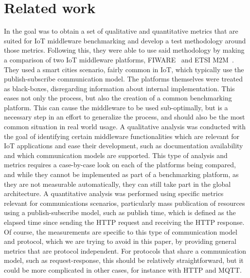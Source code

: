 \documentclass[conference]{IEEEtran}
\begin{document}
\section{Related work}

In \cite{cardoso_benchmarking_2017} the goal was to obtain a set of qualitative and quantitative metrics that are suited for IoT middleware benchmarking and develop a test methodology around those metrics. Following this, they were able to use said methodology by making a comparison of two IoT middleware platforms, FIWARE~\cite{FIWARE27:online} and ETSI M2M~\cite{ETSIWelc14:online}. They used a smart cities scenario, fairly common in IoT, which typically use the publish-subscribe communication model. The platforms themselves were treated as black-boxes, disregarding information about internal implementation. This eases not only the process, but also the creation of a common benchmarking platform. This can cause the middleware to be used sub-optimally, but is a necessary step in an effort to generalize the process, and should also be the most common situation in real world usage. A qualitative analysis was conducted with the goal of identifying certain middleware functionalities which are relevant for IoT applications and ease their development, such as documentation availability and which communication models are supported. This type of analysis and metrics requires a case-by-case look on each of the platforms being compared, and while they cannot be implemented as part of a benchmarking platform, as they are not measurable automatically, they can still take part in the global architecture. A quantitative analysis was performed using specific metrics relevant for communications scenarios, particularly mass publication of resources using a publish-subscribe model, such as publish time, which is defined as the elapsed time since sending the HTTP request and receiving the HTTP response. Of course, the measurements are specific to this type of communication model and protocol, which we are trying to avoid in this paper, by providing general metrics that are protocol independent. For protocols that share a communication model, such as request-response, this should be relatively straightforward, but it could be more complicated in other cases, for instance with HTTP and MQTT.
\end{document}
